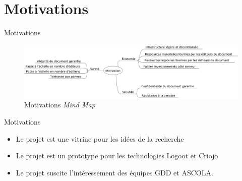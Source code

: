 \section{Motivations}
\begin{frame}{Motivations}
  \begin{figure}
    \center
    \includegraphics[width=.9\textwidth]{includes/motivations.pdf}
    \caption{Motivations \emph{Mind Map}}
  \end{figure}
\end{frame}
\begin{frame}{Motivations}
  \begin{itemize}
    \item Le projet est une vitrine pour les idées de la recherche
    \item Le projet est un prototype pour les technologies Logoot et Criojo
    \item Le projet suscite l'intéressement des équipes GDD et ASCOLA.
  \end{itemize}
\end{frame}

